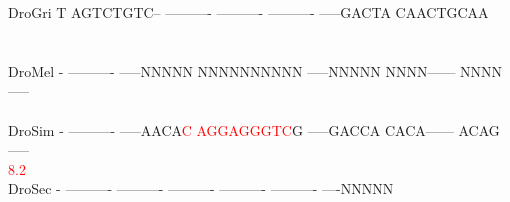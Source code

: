 \documentclass[11pt,twoside,reqno,a4paper]{article}
\begin{document}
{DroGri	T	AGTCTGTC--	----------	----------	----------	-----GACTA	CAACTGCAA\\
\hspace*{7\charwidth}\hspace*{1\charwidth}\hspace*{1\charwidth}\hspace*{1\charwidth}\hspace*{1\charwidth}\hspace*{1\charwidth}\hspace*{1\charwidth}\\
\\
DroMel	-	----------	-----NNNNN	NNNNNNNNNN	-----NNNNN	NNNN------	NNNN-----\\
\hspace*{7\charwidth}\hspace*{1\charwidth}\hspace*{1\charwidth}\hspace*{1\charwidth}\hspace*{1\charwidth}\hspace*{1\charwidth}\hspace*{1\charwidth}\\
DroSim	-	----------	-----AACA\textcolor{Red}{C}	\textcolor{Red}{A}\textcolor{Red}{G}\textcolor{Red}{G}\textcolor{Red}{A}\textcolor{Red}{G}\textcolor{Red}{G}\textcolor{Red}{G}\textcolor{Red}{T}\textcolor{Red}{C}G	-----GACCA	CACA------	ACAG-----\\
\hspace*{7\charwidth}\hspace*{1\charwidth}\hspace*{1\charwidth}\hspace*{20\charwidth}\textcolor{Red}{8.2}\hspace*{1\charwidth}\hspace*{1\charwidth}\hspace*{1\charwidth}\hspace*{1\charwidth}\\
DroSec	-	----------	----------	----------	----------	----------	----NNNNN\\
\hspace*{7\charwidth}\hspace*{1\charwidth}\hspace*{1\charwidth}\hspace*{1\charwidth}\hspace*{1\charwidth}\hspace*{1\charwidth}\hspace*{1\charwidth}\\
}
\end{document}
